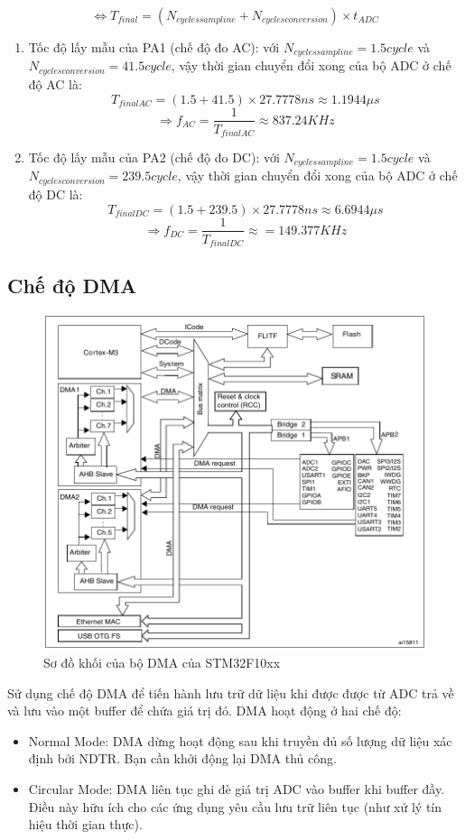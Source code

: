 \[\Leftrightarrow T_{final} = (N_{cycles sampline} + N_{cycles conversion}) \times t_{ADC}\]

	\begin{enumerate}[label = \alph *)]
		\item Tốc độ lấy mẫu của PA1 (chế độ đo AC): với $N_{cycles sampline} = 1.5 cycle$ và $N_{cycles conversion} = 41.5 cycle$, vậy thời gian chuyển đổi xong của bộ ADC ở chế độ AC là: \[T_{finalAC} = (1.5 + 41.5) \times 27.7778ns \approx 1.1944 \mu s\]
		\[\Rightarrow f_{AC} = \dfrac{1}{T_{finalAC}} \approx 837.24KHz\]
		\item Tốc độ lấy mẫu của PA2 (chế độ đo DC): với $N_{cycles sampline} = 1.5 cycle$ và $N_{cycles conversion} = 239.5 cycle$, vậy thời gian chuyển đổi xong của bộ ADC ở chế độ DC là: \[T_{finalDC} = (1.5 + 239.5) \times 27.7778ns \approx 6.6944 \mu s\]
		\[\Rightarrow f_{DC} = \dfrac{1}{T_{finalDC}} \approx = 149.377KHz\]
	\end{enumerate}

\subsection{Chế độ DMA}

\begin{figure}[H]
	\centering
	\includegraphics[width=0.7\linewidth]{./picture/DMA block diagram in connectivity line devices.pdf}
	\caption{Sơ đồ khối của bộ DMA của STM32F10xx}
	\label{f_DMA block diagram in connectivity line devices}
\end{figure}

Sử dụng chế độ DMA để tiến hành lưu trữ dữ liệu khi được được từ ADC trả về và lưu vào một buffer để chứa giá trị đó. DMA hoạt động ở hai chế độ:

\begin{itemize}[label = -]
	\item Normal Mode: DMA dừng hoạt động sau khi truyền đủ số lượng dữ liệu xác định bởi NDTR. Bạn cần khởi động lại DMA thủ công.
	\item Circular Mode: DMA liên tục ghi đè giá trị ADC vào buffer khi buffer đầy. Điều này hữu ích cho các ứng dụng yêu cầu lưu trữ liên tục (như xử lý tín hiệu thời gian thực).
\end{itemize}

